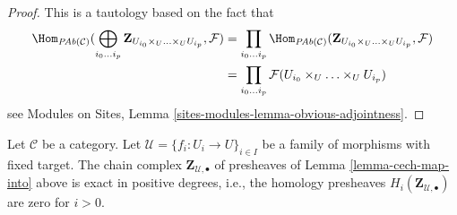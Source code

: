 \begin{proof}
This is a tautology based on the fact that
\begin{align*}
\Hom_{\textit{PAb}(\mathcal{C})}(
\bigoplus_{i_0 \ldots i_p}
\mathbf{Z}_{U_{i_0} \times_U \ldots \times_U U_{i_p}},
\mathcal{F})
& =
\prod_{i_0 \ldots i_p}
\Hom_{\textit{PAb}(\mathcal{C})}(
\mathbf{Z}_{U_{i_0} \times_U \ldots \times_U U_{i_p}},
\mathcal{F}) \\
& =
\prod_{i_0 \ldots i_p}
\mathcal{F}(U_{i_0} \times_U \ldots \times_U U_{i_p})
\end{align*}
see Modules on Sites, Lemma \ref{sites-modules-lemma-obvious-adjointness}.
\end{proof}

\begin{lemma}
\label{lemma-homology-complex}
Let $\mathcal{C}$ be a category.
Let $\mathcal{U} = \{f_i : U_i \to U\}_{i \in I}$ be a family of morphisms
with fixed target.
The chain complex $\mathbf{Z}_{\mathcal{U}, \bullet}$ of presheaves
of Lemma \ref{lemma-cech-map-into} above is exact in positive
degrees, i.e., the homology presheaves
$H_i(\mathbf{Z}_{\mathcal{U}, \bullet})$ are zero for $i > 0$.
\end{lemma}

